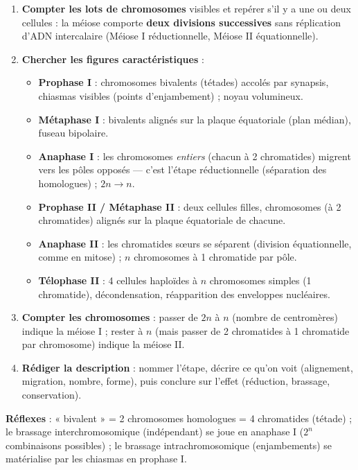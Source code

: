 \documentclass[11pt]{article}
\newcommand{\cle}[1]{{\popxbold\color{popdark}#1}}
\begin{document}
\begin{methode}
\begin{enumerate}
\item \textbf{Compter les lots de chromosomes} visibles et repérer s'il y a une ou deux cellules : la méiose comporte \textbf{deux divisions successives} sans réplication d'ADN intercalaire (Méiose I réductionnelle, Méiose II équationnelle).
\item \textbf{Chercher les figures caractéristiques} :
\begin{itemize}
\item \textbf{Prophase I} : chromosomes bivalents (tétades) accolés par synapsis, chiasmas visibles (points d'enjambement) ; noyau volumineux.
\item \textbf{Métaphase I} : bivalents alignés sur la plaque équatoriale (plan médian), fuseau bipolaire.
\item \textbf{Anaphase I} : les chromosomes \emph{entiers} (chacun à 2 chromatides) migrent vers les pôles opposés — c'est l'étape \cle{réductionnelle} (séparation des homologues) ; $2n \to n$.
\item \textbf{Prophase II / Métaphase II} : deux cellules filles, chromosomes (à 2 chromatides) alignés sur la plaque équatoriale de chacune.
\item \textbf{Anaphase II} : les chromatides sœurs se séparent (division équationnelle, comme en mitose) ; $n$ chromosomes à 1 chromatide par pôle.
\item \textbf{Télophase II} : 4 cellules haploïdes à $n$ chromosomes simples (1 chromatide), décondensation, réapparition des enveloppes nucléaires.
\end{itemize}
\item \textbf{Compter les chromosomes} : passer de $2n$ à $n$ (nombre de centromères) indique la méiose I ; rester à $n$ (mais passer de 2 chromatides à 1 chromatide par chromosome) indique la méiose II.
\item \textbf{Rédiger la description} : nommer l'étape, décrire ce qu'on voit (alignement, migration, nombre, forme), puis conclure sur l'effet (réduction, brassage, conservation).
\end{enumerate}
\textbf{Réflexes} : « bivalent » = 2 chromosomes homologues = 4 chromatides (tétade) ; le brassage interchromosomique (indépendant) se joue en anaphase I ($2^{n}$ combinaisons possibles) ; le brassage intrachromosomique (enjambements) se matérialise par les chiasmas en prophase I.
\end{methode}
\end{document}
